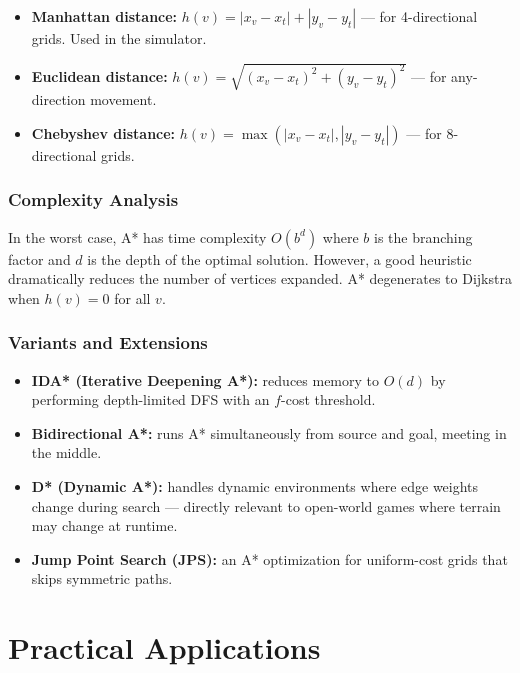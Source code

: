 \documentclass[12pt, a4paper, oneside]{report}
\theoremstyle{definition}
\begin{document}
\begin{itemize}
    \item \textbf{Manhattan distance:} $h(v) = |x_v - x_t| + |y_v - y_t|$ — for 4-directional grids. Used in the simulator.
    \item \textbf{Euclidean distance:} $h(v) = \sqrt{(x_v - x_t)^2 + (y_v - y_t)^2}$ — for any-direction movement.
    \item \textbf{Chebyshev distance:} $h(v) = \max(|x_v - x_t|, |y_v - y_t|)$ — for 8-directional grids.
\end{itemize}

\subsection{Complexity Analysis}

In the worst case, A* has time complexity $O(b^d)$ where $b$ is the branching factor and $d$ is the depth of the optimal solution. However, a good heuristic dramatically reduces the number of vertices expanded. A* degenerates to Dijkstra when $h(v) = 0$ for all $v$.

\subsection{Variants and Extensions}

\begin{itemize}
    \item \textbf{IDA* (Iterative Deepening A*):} reduces memory to $O(d)$ by performing depth-limited DFS with an $f$-cost threshold.
    \item \textbf{Bidirectional A*:} runs A* simultaneously from source and goal, meeting in the middle.
    \item \textbf{D* (Dynamic A*):} handles dynamic environments where edge weights change during search — directly relevant to open-world games where terrain may change at runtime.
    \item \textbf{Jump Point Search (JPS):} an A* optimization for uniform-cost grids that skips symmetric paths.
\end{itemize}

\chapter{Practical Applications}
\end{document}
